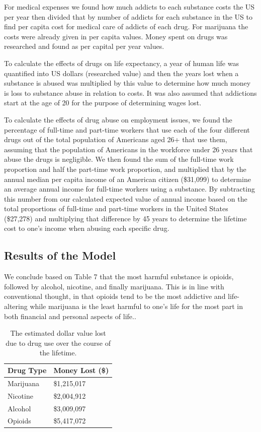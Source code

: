 \documentclass[12pt]{article}
\begin{document}
For medical expenses we found how much addicts to each substance costs the US per year then divided that by number of addicts for each substance in the US to find per capita cost for medical care of addicts of each drug. For marijuana the costs were already given in per capita values. Money spent on drugs was researched and found as per capital per year values. 

To calculate the effects of drugs on life expectancy, a year of human life was quantified into US dollars (researched value) and then the years lost when a substance is abused was multiplied by this value to determine how much money is loss to substance abuse in relation to costs. It was also assumed that addictions start at the age of 20 for the purpose of determining wages lost.

To calculate the effects of drug abuse on employment issues, we found the percentage of full-time and part-time workers that use each of the four different drugs out of the total population of Americans aged 26+ that use them, assuming that the population of Americans in the workforce under 26 years that abuse the drugs is negligible. We then found the sum of the full-time work proportion and half the part-time work proportion, and multiplied that by the annual median per capita income of an American citizen (\$31,099) \cite{income} to determine an average annual income for full-time workers using a substance. By subtracting this number from our calculated expected value of annual income based on the total proportions of full-time and part-time workers in the United States (\$27,278) and multiplying that difference by 45 years to determine the lifetime cost to one’s income when abusing each specific drug.

\subsection{Results of the Model}

We conclude based on Table 7 that the most harmful substance is opioids, followed by alcohol, nicotine, and finally marijuana. This is in line with conventional thought, in that opioids tend to be the most addictive and life-altering while marijuana is the least harmful to one's life for the most part in both financial and personal aspects of life..

\begin{table}[]
\begin{tabular}{@{}ll@{}}
\toprule
Drug Type & Money Lost (\$) \\ \midrule
Marijuana & \$1,215,017     \\
Nicotine  & \$2,004,912     \\
Alcohol   & \$3,009,097     \\
Opioids   & \$5,417,072     \\ \bottomrule
\end{tabular}
\caption{The estimated dollar value lost due to drug use over the course of the lifetime.}
\end{table}
\end{document}
